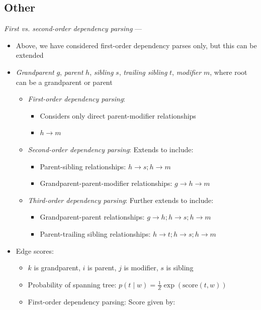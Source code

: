 \subsection*{Other}
\emph{First vs. second-order dependency parsing} ---
\begin{itemize}
    \item Above, we have considered first-order dependency parses only, but this can be extended
    \item \emph{Grandparent} $g$, \emph{parent} $h$, \emph{sibling} $s$, \emph{trailing sibling} $t$, \emph{modifier} $m$, where root can be a grandparent or parent
    \begin{itemize}
        \item \emph{First-order dependency parsing}:
        \begin{itemize}
            \item Considers only direct parent-modifier relationships
            \item $h \rightarrow m$
        \end{itemize}
        \item \emph{Second-order dependency parsing}: Extends to include:
        \begin{itemize}
            \item Parent-sibling relationships: $h \rightarrow s; h \rightarrow m$
            \item Grandparent-parent-modifier relationships: $g \rightarrow h \rightarrow m$
        \end{itemize}
        \item \emph{Third-order dependency parsing}: Further extends to include:
        \begin{itemize}
            \item Grandparent-parent relationships: $g \rightarrow h; h \rightarrow s; h \rightarrow m$
            \item Parent-trailing sibling relationships: $h \rightarrow t; h \rightarrow s; h \rightarrow m$
        \end{itemize}
    \end{itemize}
    \item Edge scores:
    \begin{itemize}
        \item $k$ is grandparent, $i$ is parent, $j$ is modifier, $s$ is sibling
        \item Probability of spanning tree: $
        p(t \mid w) = \frac{1}{Z} \exp(\textrm{score}(t, w))
        $ 
        \item First-order dependency parsing: Score given by:

\end{itemize}
\end{itemize}
